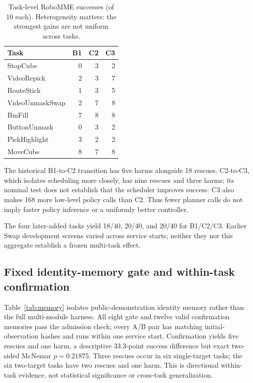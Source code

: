 \documentclass[letterpaper,10pt,conference]{ieeeconf}
\begin{document}
\begin{table}[t]
\caption{Task-level RoboMME successes (of 10 each). Heterogeneity matters: the strongest gains are not uniform across tasks.}
\label{tab:tasks}
\centering\footnotesize
\begin{tabular}{lrrr}
\toprule
Task & B1 & C2 & C3\\
\midrule
StopCube & 0 & 3 & 2\\
VideoRepick & 2 & 3 & 7\\
RouteStick & 1 & 3 & 5\\
VideoUnmaskSwap & 2 & 7 & 8\\
BinFill & 7 & 8 & 8\\
ButtonUnmask & 0 & 3 & 2\\
PickHighlight & 3 & 2 & 2\\
MoveCube & 8 & 7 & 8\\
\bottomrule
\end{tabular}
\end{table}

The historical B1-to-C2 transition has five harms alongside 18 rescues. C2-to-C3, which isolates scheduling more closely, has nine rescues and three harms; its nominal test does not establish that the scheduler improves success. C3 also makes 168 more low-level policy calls than C2. Thus fewer planner calls do not imply faster policy inference or a uniformly better controller.

The four later-added tasks yield 18/40, 20/40, and 20/40 for B1/C2/C3.
Earlier Swap development screens varied across service starts; neither
they nor this aggregate establish a frozen multi-task effect.

\subsection{Fixed identity-memory gate and within-task confirmation}
Table~\ref{tab:memory} isolates public-demonstration identity memory rather
than the full multi-module harness. All eight gate and twelve valid
confirmation memories pass the admission check; every A/B pair has matching
initial-observation hashes and runs within one service start. Confirmation
yields five rescues and one harm, a descriptive 33.3-point success difference
but exact two-sided McNemar $p=0.21875$. Three rescues occur in six
single-target tasks; the six two-target tasks have two rescues and one harm.
This is directional within-task evidence, not statistical significance or
cross-task generalization.
\end{document}
